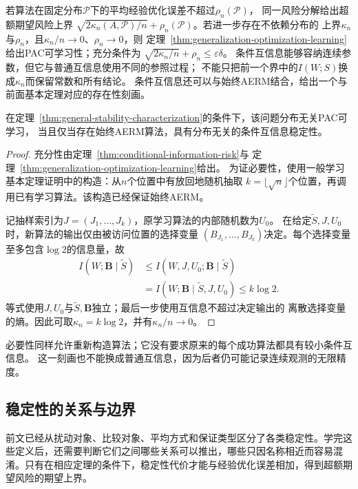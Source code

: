 若算法在固定分布$\mathcal P$下的平均经验优化误差不超过$\rho_n(\mathcal P)$，
同一风险分解给出超额期望风险上界
$\sqrt{2\kappa_n(A,\mathcal P)/n}+\rho_n(\mathcal P)$。若进一步存在不依赖分布的
上界$\kappa_n$与$\rho_n$，且$\kappa_n/n\to0$、$\rho_n\to0$，则
定理~\ref{thm:generalization-optimization-learning}给出PAC可学习性；充分条件为
$\sqrt{2\kappa_n/n}+\rho_n\leq\varepsilon\delta$。
条件互信息能够容纳连续参数，但它与普通互信息使用不同的参照过程；
不能只把前一个界中的$I(W;S)$换成$\kappa_n$而保留常数和所有结论。
条件互信息还可以与始终AERM结合，给出一个与前面基本定理对应的存在性刻画。

\begin{theorem}[条件互信息稳定性与可学习性]
\label{thm:conditional-information-learning}
在定理~\ref{thm:general-stability-characterization}的条件下，该问题分布无关PAC可学习，
当且仅当存在始终AERM算法，具有分布无关的条件互信息稳定性。
\end{theorem}
\begin{proof}
充分性由定理~\ref{thm:conditional-information-risk}与
定理~\ref{thm:generalization-optimization-learning}给出。
为证必要性，使用一般学习基本定理证明中的构造：从$n$个位置中有放回地随机抽取
$k=\lfloor\sqrt n\rfloor$个位置，再调用已有学习算法。该构造已经保证始终AERM。

记抽样索引为$J=(J_1,\ldots,J_k)$，原学习算法的内部随机数为$U_0$。
在给定$\tilde S,J,U_0$时，新算法的输出仅由被访问位置的选择变量
$(B_{J_1},\ldots,B_{J_k})$决定。每个选择变量至多包含$\log2$的信息量，故
\begin{align*}
 I(W;\bm B\mid\tilde S)
 &\leq I(W,J,U_0;\bm B\mid\tilde S)\\
 &=I(W;\bm B\mid\tilde S,J,U_0)
 \leq k\log2.
\end{align*}
等式使用$J,U_0$与$\tilde S,\bm B$独立；最后一步使用互信息不超过决定输出的
离散选择变量的熵。因此可取$\kappa_n=k\log2$，并有$\kappa_n/n\to0$。
\end{proof}

必要性同样允许重新构造算法；它没有要求原来的每个成功算法都具有较小条件互信息。
这一刻画也不能换成普通互信息，因为后者仍可能记录连续观测的无限精度。

\subsection{稳定性的关系与边界}
\label{sec:stability-comparison}

前文已经从扰动对象、比较对象、平均方式和保证类型区分了各类稳定性。学完这些定义后，还需要判断它们之间哪些关系可以推出，哪些只因名称相近而容易混淆。只有在相应定理的条件下，稳定性代价才能与经验优化误差相加，得到超额期望风险的期望上界。

